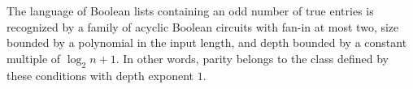 \begin{theorem}
\label{Language.parity_inNC_one}
\leanok
{}
The language of Boolean lists containing an odd number of true entries is recognized by
a family of acyclic Boolean circuits with fan-in at most two, size bounded by a
polynomial in the input length, and depth bounded by a constant multiple of $\log_2
n+1$. In other words, parity belongs to the class defined by these conditions with depth
exponent $1$.
\end{theorem}
